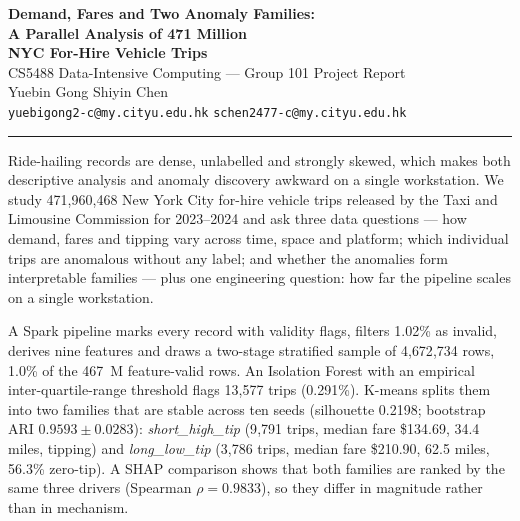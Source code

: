 \documentclass[11pt,a4paper]{article}
\newcommand{\code}[1]{\texttt{\small #1}}
\begin{document}
\begin{center}
{\LARGE\bfseries Demand, Fares and Two Anomaly Families:\\[0.15em]
A Parallel Analysis of 471 Million\\[0.05em]
NYC For-Hire Vehicle Trips}\\[1.1em]
{\large CS5488 Data-Intensive Computing --- Group 101 Project Report}\\[0.9em]
Yuebin Gong \quad Shiyin Chen\\
\code{yuebigong2-c@my.cityu.edu.hk} \quad \code{schen2477-c@my.cityu.edu.hk}\\[0.5em]
\date{}
\end{center}

\vspace{0.3em}

\par
\vspace{-0.3em}
\noindent\rule{\textwidth}{0.4pt}\par
\begingroup\small

Ride-hailing records are dense, unlabelled and strongly skewed, which makes both descriptive analysis and anomaly discovery awkward on a single workstation. We study 471{,}960{,}468 New York City for-hire vehicle trips released by the Taxi and Limousine Commission for 2023--2024 and ask three data questions --- how demand, fares and tipping vary across time, space and platform; which individual trips are anomalous without any label; and whether the anomalies form interpretable families --- plus one engineering question: how far the pipeline scales on a single workstation.

A Spark pipeline marks every record with validity flags, filters 1.02\% as invalid, derives nine features and draws a two-stage stratified sample of 4{,}672{,}734 rows, 1.0\% of the 467~M feature-valid rows. An Isolation Forest with an empirical inter-quartile-range threshold flags 13{,}577 trips (0.291\%). K-means splits them into two families that are stable across ten seeds (silhouette 0.2198; bootstrap ARI $0.9593 \pm 0.0283$): \emph{short\_high\_tip} (9{,}791 trips, median fare \$134.69, 34.4 miles, tipping) and \emph{long\_low\_tip} (3{,}786 trips, median fare \$210.90, 62.5 miles, 56.3\% zero-tip). A SHAP comparison shows that both families are ranked by the same three drivers (Spearman $\rho = 0.9833$), so they differ in magnitude rather than in mechanism.
\end{document}
